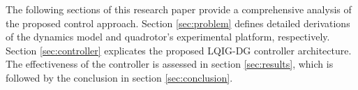 \documentclass[3p,times]{elsarticle}
\begin{document}

The following sections of this research paper provide a comprehensive analysis of the proposed control approach. Section \ref{sec:problem} defines detailed derivations of the dynamics model and quadrotor's experimental platform, respectively. Section \ref{sec:controller} explicates the proposed LQIG-DG controller architecture. The effectiveness of the controller is assessed in section \ref{sec:results}, which is followed by the conclusion in section \ref{sec:conclusion}.
\end{document}
